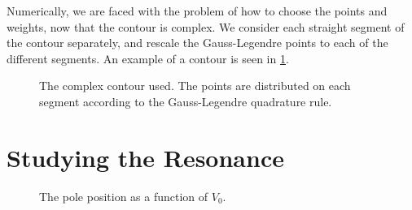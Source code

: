 Numerically, we are faced with the problem of how to choose 
the points and weights, now that the contour is complex. 
We consider each straight segment of the contour separately, 
and rescale the Gauss-Legendre points to each of the different segments.
An example of a contour is seen in 
\cref{fig:triangle contour}.

\begin{figure}[H]
  \centering
  \caption{The complex contour used. The points are distributed on each segment according to the Gauss-Legendre quadrature rule.}
  \label{fig:triangle contour}
\end{figure}

\section{Studying the Resonance}


\begin{figure}
  \centering	
  \caption{The pole position as a function of $V_0$.}
  \label{fig:pole position}

\end{figure}
